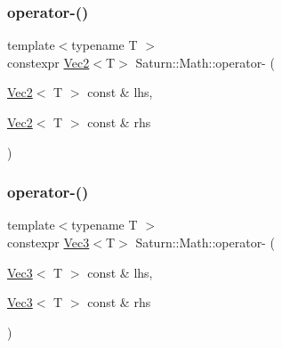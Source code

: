 \subsubsection{\texorpdfstring{operator-\/()}{operator-()}\hspace{0.1cm}{\footnotesize\ttfamily [2/4]}}
{\footnotesize\ttfamily template$<$typename T $>$ \\
constexpr \mbox{\hyperlink{namespace_saturn_1_1_math_a8befc95aeff660bda92b8807c1cc5224}{Vec2}}$<$T$>$ Saturn\+::\+Math\+::operator-\/ (\begin{DoxyParamCaption}\item[{\mbox{\hyperlink{namespace_saturn_1_1_math_a8befc95aeff660bda92b8807c1cc5224}{Vec2}}$<$ T $>$ const \&}]{lhs,  }\item[{\mbox{\hyperlink{namespace_saturn_1_1_math_a8befc95aeff660bda92b8807c1cc5224}{Vec2}}$<$ T $>$ const \&}]{rhs }\end{DoxyParamCaption})}

\mbox{\label{namespace_saturn_1_1_math_a3007ed31596e60e2d533791da5b77ed4}} 
\subsubsection{\texorpdfstring{operator-\/()}{operator-()}\hspace{0.1cm}{\footnotesize\ttfamily [3/4]}}
{\footnotesize\ttfamily template$<$typename T $>$ \\
constexpr \mbox{\hyperlink{namespace_saturn_1_1_math_af4a7a893730c64ac02b620f648cc5406}{Vec3}}$<$T$>$ Saturn\+::\+Math\+::operator-\/ (\begin{DoxyParamCaption}\item[{\mbox{\hyperlink{namespace_saturn_1_1_math_af4a7a893730c64ac02b620f648cc5406}{Vec3}}$<$ T $>$ const \&}]{lhs,  }\item[{\mbox{\hyperlink{namespace_saturn_1_1_math_af4a7a893730c64ac02b620f648cc5406}{Vec3}}$<$ T $>$ const \&}]{rhs }\end{DoxyParamCaption})}

\mbox{\label{namespace_saturn_1_1_math_a41df371fb0ff831703c54b6f0927c003}} 
